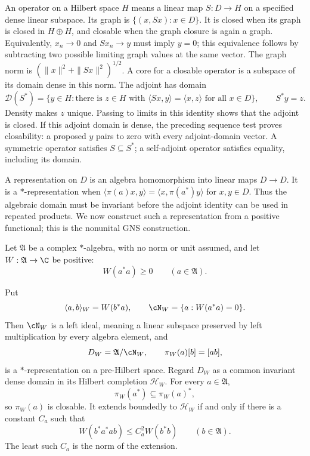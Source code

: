 An operator on a Hilbert space $H$ means a linear map $S:D\to H$ on a
specified dense linear subspace.  Its graph is $\{(x,Sx):x\in D\}$.
It is closed when its graph is closed in $H\oplus H$, and closable when
the graph closure is again a graph.  Equivalently, $x_n\to0$ and
$Sx_n\to y$ must imply $y=0$; this equivalence follows by subtracting two
possible limiting graph values at the same vector.
The graph norm is $(\|x\|^2+\|Sx\|^2)^{1/2}$.  A core for a closable
operator is a subspace of its domain dense in this norm.
The adjoint has domain
\[
 \mathcal D(S^*)=\{y\in H:\text{there is }z\in H\text{ with }
           \langle Sx,y\rangle=\langle x,z\rangle\text{ for all }x\in D\},
 \qquad S^*y=z.
\]
Density makes $z$ unique.  Passing to limits in this identity shows that
the adjoint is closed.  If this adjoint domain is dense, the preceding
sequence test proves closability: a proposed $y$ pairs to zero with every
adjoint-domain vector.  A symmetric operator satisfies $S\subseteq S^*$;
a self-adjoint operator satisfies equality, including its domain.

A representation on $D$ is an algebra homomorphism into linear maps
$D\to D$.  It is a $*$-representation when
$\langle\pi(a)x,y\rangle=\langle x,\pi(a^*)y\rangle$ for $x,y\in D$.
Thus the algebraic domain must be invariant before the adjoint identity
can be used in repeated products.  We now construct such a representation
from a positive functional; this is the nonunital GNS construction.

Let $\mathfrak A$ be a complex $*$-algebra, with no norm or unit assumed,
and let $W:\mathfrak A\to\C$ be positive:
\[
 W(a^*a)\geq0\qquad(a\in\mathfrak A).
\]

\begin{theorem}
\label{thm:gns}
Put
\[
 \langle a,b\rangle_W=W(b^*a),
 \qquad
 \cN_W=\{a:W(a^*a)=0\}.
\]
Then $\cN_W$ is a left ideal, meaning a linear subspace preserved by
left multiplication by every algebra element, and
\begin{equation}
 D_W=\mathfrak A/\cN_W,
 \qquad
 \pi_W(a)[b]=[ab],
 \label{eq:gns-action}
\end{equation}
is a $*$-representation on a pre-Hilbert space.  Regard $D_W$ as a
common invariant dense domain in its Hilbert completion $\mathcal H_W$.
For every $a\in\mathfrak A$,
\begin{equation}
 \pi_W(a^*)\subseteq\pi_W(a)^*,
 \label{eq:adjoint-inclusion}
\end{equation}
so $\pi_W(a)$ is closable.  It extends boundedly to $\mathcal H_W$ if
and only if there is a constant $C_a$ such that
\begin{equation}
 W(b^*a^*ab)\leq C_a^2W(b^*b)
 \qquad(b\in\mathfrak A).
 \label{eq:multiplier-bound}
\end{equation}
The least such $C_a$ is the norm of the extension.
\end{theorem}

